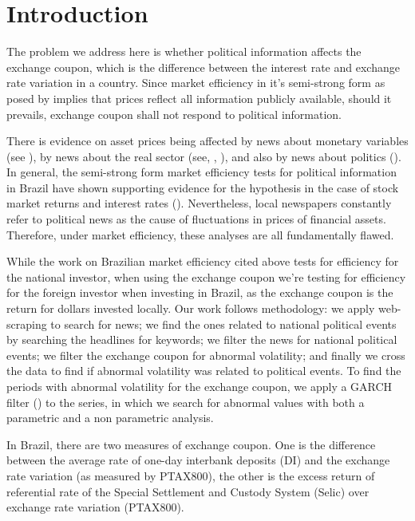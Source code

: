 \documentclass[cic,tc, english]{iiufrgs}
\begin{document}
\chapter{Introduction} \label{chapter_introduction}

    The problem we address here is whether political information affects the exchange coupon, which is the difference between the interest rate and exchange rate variation in a country. Since market efficiency in it's semi-strong form as posed by  \citet{fama1970} implies that prices reflect all information publicly available, should it prevails, exchange coupon shall not respond to political information.
  
    There is evidence on asset prices being affected by news about monetary variables (see \citet{cornell1983}), by news about the real sector (see, \citet{mcqueenroley1993}, \citet{caporaleetal2015}), and also by news about politics (\citet{marquessantos2016}). In general, the semi-strong form market efficiency tests for political information in Brazil have shown supporting evidence for the hypothesis in the case of stock market returns and interest rates (\citet{marquessantos2016}). Nevertheless, local newspapers constantly refer to political news as the cause of fluctuations in prices of financial assets. Therefore, under market efficiency, these analyses are all fundamentally flawed.
  
    While the work on Brazilian market efficiency cited above tests for efficiency for the national investor, when using the exchange coupon we're testing for efficiency for the foreign investor when investing in Brazil, as the exchange coupon is the return for dollars invested locally. Our work follows \citet{marquessantos2016} methodology: we apply web-scraping to search for news; we find the ones related to national political events by searching the headlines for keywords; we filter the news for national political events; we filter the exchange coupon for abnormal volatility; and finally we cross the data to find if abnormal volatility was related to political events. To find the periods with abnormal volatility for the exchange coupon, we apply a GARCH filter (\citet{bollerslev1986}) to the series, in which we search for abnormal values with both a parametric and a non parametric analysis.

    In Brazil, there are two measures of exchange coupon. One is the difference between the average rate of one-day interbank deposits (DI) and the exchange rate variation (as measured by PTAX800), the other is the excess return of referential rate of the Special Settlement and Custody System (Selic) over exchange rate variation (PTAX800). 
  
\end{document}
